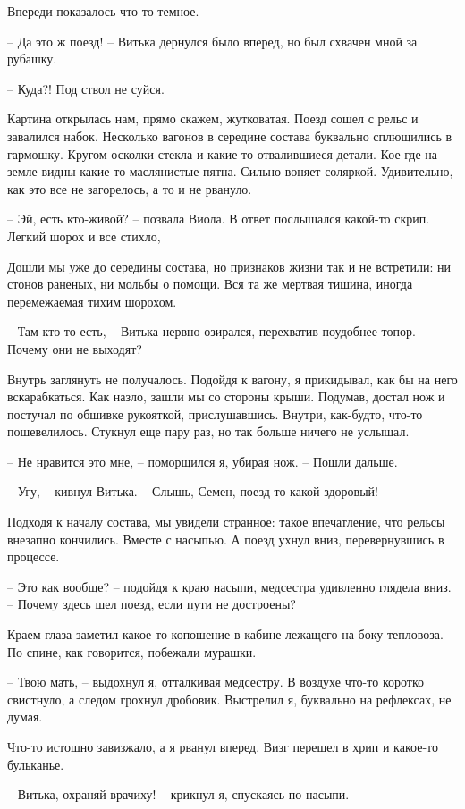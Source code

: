 \documentclass[a4paper]{book}
\begin{document}
Впереди показалось что-то темное.  

-- Да это ж поезд! -- Витька дернулся было вперед, но был схвачен мной за рубашку. 

-- Куда?! Под ствол не суйся.


Картина открылась  нам, прямо скажем, жутковатая. Поезд сошел с рельс и завалился набок. Несколько вагонов в середине состава буквально сплющились в гармошку. Кругом осколки стекла и какие-то отвалившиеся детали. Кое-где на земле видны какие-то маслянистые пятна. Сильно воняет соляркой. Удивительно, как это все не загорелось, а то и не рвануло.

-- Эй, есть кто-живой? -- позвала Виола. В ответ послышался какой-то скрип. Легкий шорох и все стихло,

Дошли мы уже до середины состава, но признаков жизни так и не встретили: ни стонов раненых, ни мольбы о помощи. Вся та же мертвая тишина, иногда перемежаемая тихим шорохом.

-- Там кто-то есть, -- Витька нервно озирался, перехватив поудобнее топор. -- Почему они не выходят?

Внутрь заглянуть не получалось. Подойдя к вагону, я прикидывал, как бы на него вскарабкаться. Как назло, зашли мы со стороны крыши. Подумав, достал нож и постучал по обшивке рукояткой, прислушавшись. Внутри, как-будто, что-то пошевелилось. Стукнул еще пару раз, но так больше ничего не услышал.

-- Не нравится это мне, -- поморщился я, убирая нож. -- Пошли дальше.

-- Угу, -- кивнул Витька. -- Слышь, Семен, поезд-то какой здоровый!

Подходя к началу состава, мы увидели странное: такое впечатление, что рельсы внезапно кончились. Вместе с насыпью. А поезд ухнул вниз, перевернувшись в процессе. 

-- Это как вообще? -- подойдя к краю насыпи, медсестра удивленно глядела вниз. -- Почему здесь шел поезд, если пути не достроены? 

Краем глаза заметил какое-то копошение в кабине лежащего на боку тепловоза. По спине, как говорится, побежали мурашки. 

-- Твою мать, -- выдохнул я, отталкивая медсестру. В воздухе что-то коротко свистнуло, а следом грохнул дробовик. Выстрелил я, буквально на рефлексах, не думая. 

Что-то истошно завизжало, а я рванул вперед. Визг перешел в хрип и какое-то бульканье. 

-- Витька, охраняй врачиху! -- крикнул я, спускаясь по насыпи. 
\end{document}
